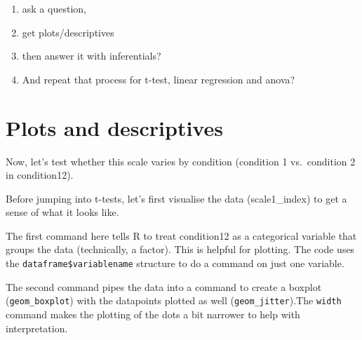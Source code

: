 \documentclass[
  letterpaper,
  DIV=11,
  numbers=noendperiod]{scrreprt}
\newenvironment{Shaded}{\begin{snugshade}}{\end{snugshade}}
\newcommand{\AttributeTok}[1]{\textcolor[rgb]{0.40,0.45,0.13}{#1}}
\newcommand{\DecValTok}[1]{\textcolor[rgb]{0.68,0.00,0.00}{#1}}
\newcommand{\FloatTok}[1]{\textcolor[rgb]{0.68,0.00,0.00}{#1}}
\newcommand{\FunctionTok}[1]{\textcolor[rgb]{0.28,0.35,0.67}{#1}}
\newcommand{\NormalTok}[1]{\textcolor[rgb]{0.00,0.23,0.31}{#1}}
\newcommand{\OtherTok}[1]{\textcolor[rgb]{0.00,0.23,0.31}{#1}}
\newcommand{\SpecialCharTok}[1]{\textcolor[rgb]{0.37,0.37,0.37}{#1}}
\providecommand{\tightlist}{%
  \setlength{\itemsep}{0pt}\setlength{\parskip}{0pt}}\usepackage{longtable,booktabs,array}
\begin{document}
\begin{enumerate}
\def\labelenumi{\arabic{enumi}.}
\tightlist
\item
  ask a question,
\item
  get plots/descriptives
\item
  then answer it with inferentials?
\item
  And repeat that process for t-test, linear regression and anova?
\end{enumerate}

\section{Plots and descriptives}\label{plots-and-descriptives}

Now, let's test whether this scale varies by condition (condition 1
vs.~condition 2 in condition12).

Before jumping into t-tests, let's first visualise the data
(scale1\_index) to get a sense of what it looks like.

The first command here tells R to treat condition12 as a categorical
variable that groups the data (technically, a factor). This is helpful
for plotting. The code uses the \texttt{dataframe\$variablename}
structure to do a command on just one variable.

The second command pipes the data into a command to create a boxplot
(\texttt{geom\_boxplot}) with the datapoints plotted as well
(\texttt{geom\_jitter}).The \texttt{width} command makes the plotting of
the dots a bit narrower to help with interpretation.

\begin{Shaded}
\end{Shaded}
\end{document}
